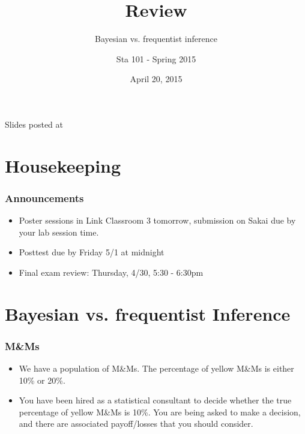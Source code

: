 \documentclass[slidestop,compress,mathserif,12pt,t,professionalfonts,xcolor=table]{beamer}
\title{Review}
\subtitle{Bayesian vs. frequentist inference}
\author{Sta 101 - Spring 2015}
\date{April 20, 2015}
\institute{Duke University, Department of Statistical Science}
\begin{document}


\begin{frame}[plain]

\titlepage
\vfill
{\scriptsize {} \hfill Slides posted at  \webLink{\CourseSite}{\CourseSite}}
\addtocounter{framenumber}{-1} 

\end{frame}


\section{Housekeeping}


\begin{frame}
\frametitle{Announcements}

\begin{itemize}

\item Poster sessions in Link Classroom 3 tomorrow, submission on Sakai due by your lab session time.

\item Posttest due by Friday 5/1 at midnight

\item Final exam review: Thursday, 4/30, 5:30 - 6:30pm

\end{itemize}

\end{frame}


\section{Bayesian vs. frequentist Inference}


\begin{frame}
\frametitle{M\&Ms}

\begin{itemize}

\item We have a population of M\&Ms. The percentage of yellow M\&Ms is either 10\% or 20\%.

\item You have been hired as a statistical consultant to decide whether the true percentage of yellow M\&Ms is 10\%. You are being asked to make a decision, and there are associated payoff/losses that you should consider.

\end{itemize}

\end{frame}
\end{document}
